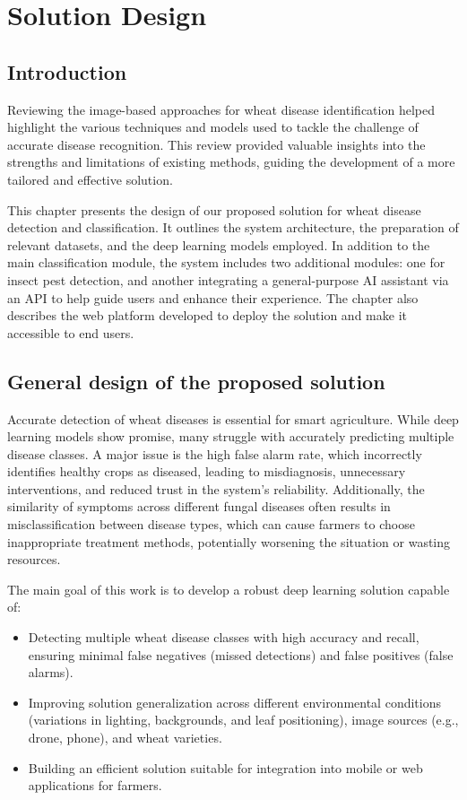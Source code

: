\chapter{Solution Design}

\section{Introduction}

Reviewing the image-based approaches for wheat disease identification helped highlight the various techniques and models used to tackle the challenge of accurate disease recognition. This review provided valuable insights into the strengths and limitations of existing methods, guiding the development of a more tailored and effective solution.

This chapter presents the design of our proposed solution for wheat disease detection and classification. It outlines the system architecture, the preparation of relevant datasets, and the deep learning models employed. In addition to the main classification module, the system includes two additional modules: one for insect pest detection, and another integrating a general-purpose AI assistant via an API to help guide users and enhance their experience. The chapter also describes the web platform developed to deploy the solution and make it accessible to end users.

\section{General design of the proposed solution}
Accurate detection of wheat diseases is essential for smart agriculture. While deep learning models show promise, many struggle with accurately predicting multiple disease classes. A major issue is the high false alarm rate, which incorrectly identifies healthy crops as diseased, leading to misdiagnosis, unnecessary interventions, and reduced trust in the system's reliability. Additionally, the similarity of symptoms across different fungal diseases often results in misclassification between disease types, which can cause farmers to choose inappropriate treatment methods, potentially worsening the situation or wasting resources.

The main goal of this work is to develop a robust deep learning solution capable of:
\begin{itemize}
    \item Detecting multiple wheat disease classes with high accuracy and recall, ensuring minimal false negatives (missed detections) and false positives (false alarms).
    \item Improving solution generalization across different environmental conditions (variations in lighting, backgrounds, and leaf positioning), image sources (e.g., drone, phone), and wheat varieties.
    \item Building an efficient solution suitable for integration into mobile or web applications for farmers.
\end{itemize}

